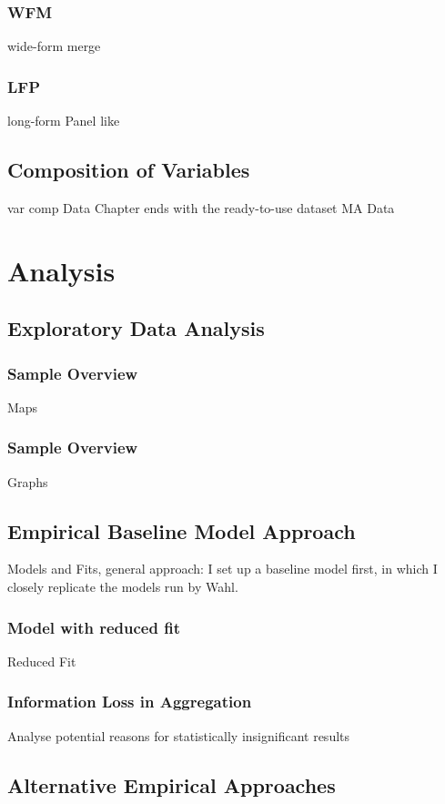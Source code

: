\documentclass[
12pt, %
english, %
onehalfspacing, %
oneside,
headsepline, %
openany
]{MastersDoctoralThesis} %
\begin{document}
\subsection{WFM}
wide-form merge

\subsection{LFP}
long-form Panel like

\section{Composition of Variables}
var comp
Data Chapter ends with the ready-to-use dataset MA Data

\newpage

\chapter{Analysis}

\section{Exploratory Data Analysis}
\subsection{Sample Overview}
Maps
\subsection{Sample Overview}
Graphs

\section{Empirical Baseline Model Approach}
Models and Fits, general approach:
I set up a baseline model first, in which I closely replicate the models run by Wahl.

\subsection{Model with reduced fit}
Reduced Fit 

\subsection{Information Loss in Aggregation}
Analyse potential reasons for statistically insignificant results

\section{Alternative Empirical Approaches}
\end{document}
